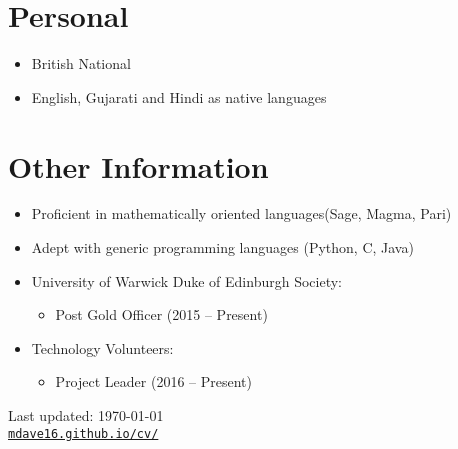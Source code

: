 \documentclass[letterpaper]{article}
\def\footerlink{mdave16.github.io/cv/}
\begin{document}
	\section*{Personal}
	\begin{itemize}
		\item British National
		\item English, Gujarati and Hindi as native languages
		
	\end{itemize}
	\section*{Other Information}
	\begin{itemize}
		\item Proficient in mathematically oriented languages(Sage, Magma, Pari)
		\item Adept with generic programming languages (Python, C, Java)
		\item University of Warwick Duke of Edinburgh Society:
		\begin{itemize}
			\item Post Gold Officer (2015 -- Present)
		\end{itemize}
		\item Technology Volunteers:
		\begin{itemize}
			\item Project Leader (2016 -- Present)
		\end{itemize} 
	\end{itemize}
	\bigskip
	\begin{center}
		\begin{footnotesize}
			Last updated: \today \\
			\href{\footerlink}{\texttt{\footerlink}}
		\end{footnotesize}
	\end{center}
\end{document}
